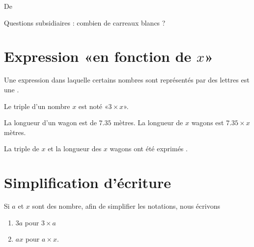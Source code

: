 


De \cite{NRHooXFvgpp5}

Questions subsidiaires : combien de carreaux blancs ?

\section{Expression «en fonction de \( x\)» }

\begin{definition}
    Une expression dans laquelle certains nombres sont représentés par des lettres est une .
\end{definition}

\begin{example}
    Le triple d'un nombre \( x\) est noté «\( 3\times x\)».
\end{example}

\begin{example}
    La longueur d'un wagon est de \( 7.35\) mètres. La longueur de \( x\) wagons est \( 7.35\times x\) mètres.
\end{example}

La triple de \( x\) et la longueur des \( x\) wagons ont été exprimés .

\section{Simplification d'écriture}

\begin{Aretenir}
    Si \( a\) et \( x\) sont des nombre, afin de simplifier les notations, nous écrivons
    \begin{enumerate}
        \item
            \( 3a\) pour \( 3\times a\)
        \item
            \( ax\) pour \( a\times x\).
    \end{enumerate}
\end{Aretenir}

